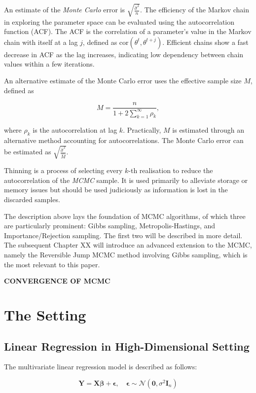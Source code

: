 \documentclass[
  11pt,
]{article}
\begin{document}
An estimate of the \emph{Monte Carlo} error is
\(\sqrt{\frac{\hat{\sigma}^2}{n}}\). The efficiency of the Markov chain
in exploring the parameter space can be evaluated using the
autocorrelation function (ACF). The ACF is the correlation of a
parameter's value in the Markov chain with itself at a lag \(j\),
defined as \(\text{cor}(\theta^t, \theta^{t+j})\). Efficient chains show
a fast decrease in ACF as the lag increases, indicating low dependency
between chain values within a few iterations.

An alternative estimate of the Monte Carlo error uses the effective
sample size \(M\), defined as

\begin{equation}
M = \frac{n}{1 + 2 \sum_{k=1}^{\infty} \rho_k},
\end{equation}

where \(\rho_k\) is the autocorrelation at lag \(k\). Practically, \(M\)
is estimated through an alternative method accounting for
autocorrelations. The Monte Carlo error can be estimated as
\(\sqrt{\frac{\hat{\sigma}^2}{\hat{M}}}\).

Thinning is a process of selecting every \(k\)-th realisation to reduce
the autocorrelation of the \emph{MCMC} sample. It is used primarily to
alleviate storage or memory issues but should be used judiciously as
information is lost in the discarded samples.

The description above lays the foundation of MCMC algorithms, of which
three are particularly prominent: Gibbs sampling, Metropolis-Hastings,
and Importance/Rejection sampling. The first two will be described in
more detail. The subsequent Chapter XX will introduce an advanced
extension to the MCMC, namely the Reversible Jump MCMC method involving
Gibbs sampling, which is the most relevant to this paper.

\textbf{CONVERGENCE OF MCMC}

\newpage

\section{The Setting}
  \subsection{Linear Regression in High-Dimensional Setting}

The multivariate linear regression model is described as follows:

\begin{equation}
\mathbf{Y} = \mathbf{X}\boldsymbol{\beta} + \boldsymbol{\epsilon}, \quad \boldsymbol{\epsilon} \sim \mathcal{N}(\mathbf{0}, \sigma^2\mathbf{I}_n)
\end{equation}
\end{document}
